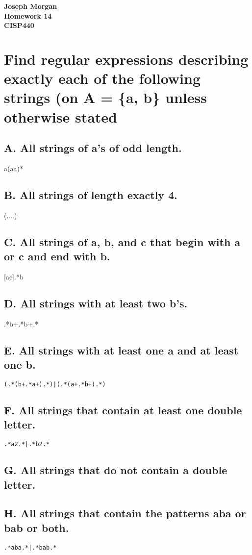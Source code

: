 \documentclass[12pt,titlepage]{article}
\begin{document}
\begin{titlepage}
	\centering
	\vfill
	{\bfseries\Large
		Joseph Morgan\\
		\large
		Homework 14\\
		\vskip2cm
		CISP440\\
	}
	\vfill
	\vfill
	\vfill
\end{titlepage}

\section{Find regular expressions describing exactly each of the following
strings (on A = \{a, b\} unless otherwise stated}

\subsection*{A. All strings of a's of odd length.}
a(aa)*
\subsection*{B. All strings of length exactly 4.}
(....)
\subsection*{C. All strings of a, b, and c that begin with a or c and end with b.}
[ac].*b
\subsection*{D. All strings with at least two b's.}
.*b+.*b+.*
\subsection*{E. All strings with at least one a and at least one b.}
\texttt{(.*(b+.*a+).*)|(.*(a+.*b+).*)}
\subsection*{F. All strings that contain at least one double letter.}
\texttt{.*a{2}.*|.*b{2}.*}
\subsection*{G. All strings that do not contain a double letter.}
\subsection*{H. All strings that contain the patterns aba or bab or both.}
\texttt{.*aba.*|.*bab.*}
\end{document}

